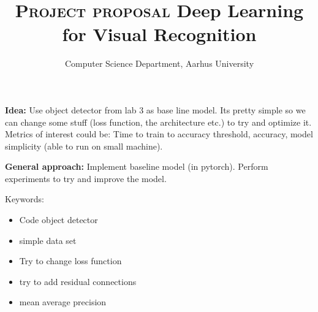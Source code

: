 \documentclass[12pt]{article}
\title{
    \vspace{5cm}
    \Large{\textsc{Project proposal}}
    \linebreak
    \Large{Deep Learning for Visual Recognition}
}
\author{Computer Science Department, Aarhus University}
\begin{document}


\textbf{Idea:} Use object detector from lab 3 as base line model. Its pretty simple so we can change some stuff (loss function, the architecture etc.) to try and optimize it. Metrics of interest could be: Time to train to accuracy threshold, accuracy, model simplicity (able to run on small machine).

\textbf{General approach:} Implement baseline model (in pytorch). Perform experiments to try and improve the model. 

Keywords:
\begin{itemize}
	\item Code object detector 
	\item simple data set
	\item Try to change loss function
	\item try to add residual connections
	\item mean average precision
\end{itemize}

% 
% 
\end{document}
